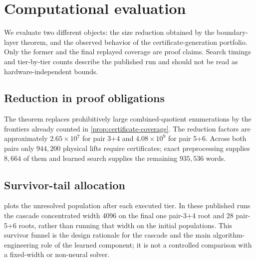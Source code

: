 \section{Computational evaluation}
\label{sec:evaluation}

We evaluate two different objects: the size reduction obtained by the
boundary-layer theorem, and the observed behavior of the certificate-generation
portfolio.  Only the former and the final replayed coverage are proof claims.
Search timings and tier-by-tier counts describe the published run and should
not be read as hardware-independent bounds.

\subsection{Reduction in proof obligations}

The theorem replaces prohibitively large combined-quotient enumerations by
the frontiers already counted in \cref{prop:certificate-coverage}.  The
reduction factors are approximately $2.65\times10^7$ for pair 3+4 and
$4.08\times10^9$ for pair 5+6.  Across both pairs only $944{,}200$ physical
lifts require certificates; exact preprocessing supplies $8{,}664$ of them
and learned search supplies the remaining $935{,}536$ words.

\subsection{Survivor-tail allocation}

 plots the unresolved population after each executed
tier.  In these published runs the cascade concentrated width 4096 on the
final one pair-3+4 root and 28 pair-5+6 roots, rather than running that width
on the initial populations.  This survivor funnel is the design rationale for
the cascade and the main algorithm-engineering role of the learned component;
it is not a controlled comparison with a fixed-width or non-neural solver.

